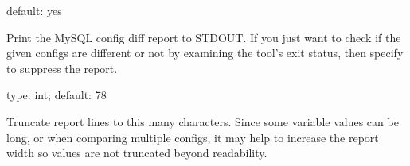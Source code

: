 \documentclass[letterpaper,10pt,english]{sphinxmanual}
\begin{document}

\begin{fulllineitems}
\label{\detokenize{mariadb-config-diff:cmdoption-mariadb-config-diff-no-report}}
\sphinxAtStartPar
default: yes

\sphinxAtStartPar
Print the MySQL config diff report to STDOUT.  If you just want to check
if the given configs are different or not by examining the tool’s exit
status, then specify  to suppress the report.

\end{fulllineitems}


\begin{fulllineitems}
\label{\detokenize{mariadb-config-diff:cmdoption-mariadb-config-diff-report-width}}
\sphinxAtStartPar
type: int; default: 78

\sphinxAtStartPar
Truncate report lines to this many characters.  Since some variable values can
be long, or when comparing multiple configs, it may help to increase the
report width so values are not truncated beyond readability.

\end{fulllineitems}
\end{document}
